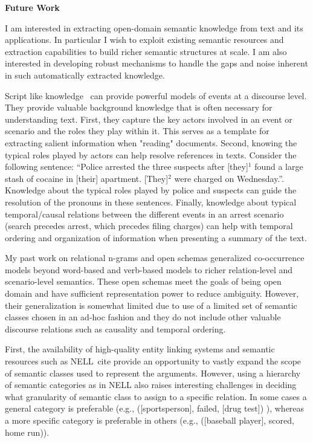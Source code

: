 \documentclass[a4paper,11pt,onecolumn]{article}
\begin{document}
{\bf Future Work}

I am interested in extracting open-domain semantic knowledge from text and its applications. In particular I wish to exploit existing semantic resources and extraction capabilities to build richer semantic structures at scale. I am also interested in developing robust mechanisms to handle the gaps and noise inherent in such automatically extracted knowledge.

Script like knowledge~\cite{schank-scripts75} can provide powerful models of events at a discourse level. They provide valuable background knowledge that is often necessary for understanding text. First, they capture the key actors involved in an event or scenario and the roles they play within it. This serves as a template for extracting salient information when "reading" documents. Second, knowing the typical roles played by actors can help resolve references in texts. Consider the following sentence: ``Police arrested the three suspects after [they]$^1$ found a large stash of cocaine in [their] apartment. [They]$^2$ were charged on Wednesday.''.  Knowledge about the typical roles played by police and suspects can guide the resolution of the pronouns in these sentences. Finally, knowledge about typical temporal/causal relations between the different events in an arrest scenario (search precedes arrest, which precedes filing charges) can help with temporal ordering and organization of information when presenting a summary of the text.

My past work on relational n-grams and open schemas generalized co-occurrence models beyond word-based and verb-based models to richer relation-level and scenario-level semantics. These open schemas meet the goals of being open domain and have sufficient representation power to reduce ambiguity. However, their generalization is somewhat limited due to use of a limited set of semantic classes chosen in an ad-hoc fashion and they do not include other valuable discourse relations such as causality and temporal ordering.

First, the availability of high-quality entity linking systems and semantic resources such as NELL~cite{} provide an opportunity to vastly expand the 
scope of semantic classes used to represent the arguments. However, using a hierarchy of semantic categories as in NELL also raises interesting challenges in deciding what granularity of semantic class to assign to a specific relation. In some cases a general category is preferable (e.g., ([sportsperson], failed, [drug test]) ), whereas a more specific category is preferable in others (e.g., ([baseball player], scored, home run)).
\end{document}
